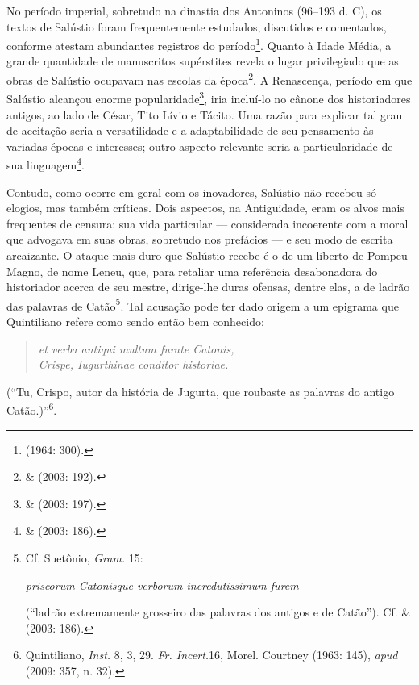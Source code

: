 No período imperial, sobretudo na dinastia dos Antoninos (96--193 d. C), os
textos de Salústio foram frequentemente estudados, discutidos e comentados,
conforme atestam abundantes registros do período\footnote{ (1964: 300).}.
Quanto à Idade Média, a grande quantidade de manuscritos supérstites revela o
lugar privilegiado que as obras de Salústio ocupavam nas escolas da
época\footnote{ \&  (2003: 192).}. A Renascença, período em que
Salústio alcançou enorme popularidade\footnote{ \&  (2003: 197).},
iria incluí-lo no cânone dos historiadores antigos, ao lado de César, Tito
Lívio e Tácito. Uma razão para explicar tal grau de aceitação seria a
versatilidade e a adaptabilidade de seu pensamento às variadas épocas e
interesses; outro aspecto relevante seria a particularidade de sua
linguagem\footnote{  \&  (2003: 186).}. 

Contudo, como ocorre em geral com os inovadores, Salústio não recebeu só
elogios, mas também críticas. Dois aspectos, na Antiguidade, eram os alvos mais
frequentes de censura: sua vida particular --- considerada incoerente com a
moral que advogava em suas obras, sobretudo nos prefácios --- e seu modo de 
escrita arcaizante.  O ataque mais duro que Salústio recebe é o de um liberto
de Pompeu Magno, de nome Leneu, que, para retaliar uma referência desabonadora
do historiador acerca de seu mestre, dirige-lhe duras ofensas, dentre elas, a
de ladrão das palavras de Catão\footnote{Cf. Suetônio, \emph{Gram.} 15: 

\emph{priscorum Catonisque verborum ineredutissimum furem}


(``ladrão extremamente grosseiro das palavras dos antigos e de Catão''). Cf.  \&
 (2003: 186).}. Tal acusação pode ter dado origem a um epigrama que
Quintiliano refere como sendo então bem conhecido: 

\begin{verse}
\emph{et verba antiqui
multum furate Catonis,\\ Crispe, Iugurthinae conditor historiae.} 

\end{verse}
 


(“Tu, Crispo,
autor da história de Jugurta, que roubaste as palavras do antigo
Catão.)”\footnote{Quintiliano, \emph{Inst.} 8, 3, 29. \emph{Fr. Incert.}16, Morel. Courtney
(1963: 145), \emph{apud } (2009: 357, n. 32).}.

